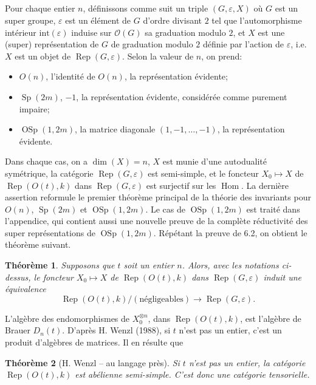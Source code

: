 \documentclass[11pt,a4paper]{article}
\theoremstyle{plain}
\newtheorem{theorem}{Th\'eor\`eme}[section]
\theoremstyle{definition}
\DeclareMathOperator{\Hom}{Hom}
\DeclareMathOperator{\Rep}{Rep}
\DeclareMathOperator{\Sp}{Sp}
\DeclareMathOperator{\OSp}{OSp}
\newcommand{\eps}{\varepsilon}
\begin{document}
\subsection{}
Pour chaque entier $n$, d\'efinissons comme suit un triple $(G, \eps, X)$ o\`u $G$ est un super groupe, $\eps$ est un \'el\'ement de $G$ d'ordre divisant $2$ tel que l'automorphisme int\'erieur $\text{int}(\eps)$ induise sur $\mathcal{O}(G)$ sa graduation modulo $2$, et $X$ est une (super) repr\'esentation de $G$ de graduation modulo $2$ d\'efinie par l'action de $\eps$, i.e. $X$ est un objet de $\Rep(G, \eps)$. Selon la valeur de $n$, on prend:
\begin{itemize}[label={},leftmargin=*]
\item[$n \geq 0$:] $O(n)$, l'identit\'e de $O(n)$, la repr\'esentation \'evidente;
\item[$n = -2m \leq 0$:] $\Sp(2m)$, $-1$, la repr\'esentation \'evidente, consid\'er\'ee comme purement impaire;
\item[$n = 1 - 2m \leq 0$:] $\OSp(1, 2m)$, la matrice diagonale $(1, -1, \ldots, -1)$, la repr\'esentation \'evidente.
\end{itemize}

Dans chaque cas, on a $\dim(X) = n$, $X$ est munie d'une autodualit\'e sym\'etrique, la cat\'egorie $\Rep(G, \eps)$ est semi-simple, et le foncteur $X_0 \mapsto X$ de $\Rep(O(t), k)$ dans $\Rep(G, \eps)$ est surjectif sur les $\Hom$. La derni\`ere assertion reformule le premier th\'eor\`eme principal de la th\'eorie des invariants pour $O(n)$, $\Sp(2m)$ et $\OSp(1, 2m)$. Le cas de $\OSp(1, 2m)$ est trait\'e dans l'appendice, qui contient aussi une nouvelle preuve de la compl\`ete r\'eductivit\'e des super repr\'esentations de $\OSp(1, 2m)$. R\'ep\'etant la preuve de 6.2, on obtient le th\'eor\`eme suivant.

\begin{theorem}
Supposons que $t$ soit un entier $n$. Alors, avec les notations ci-dessus, le foncteur $X_0 \mapsto X$ de $\Rep(O(t), k)$ dans $\Rep(G, \eps)$ induit une \'equivalence
\[
\Rep(O(t), k)/(\text{n\'egligeables}) \to \Rep(G, \eps).
\]
\end{theorem}

L'alg\`ebre des endomorphismes de $X_0^{\otimes n}$, dans $\Rep(O(t), k)$, est l'alg\`ebre de Brauer $D_n(t)$. D'apr\`es H. Wenzl (1988), si $t$ n'est pas un entier, c'est un produit d'alg\`ebres de matrices. Il en r\'esulte que

\begin{theorem}[H. Wenzl -- au langage pr\`es]
Si $t$ n'est pas un entier, la cat\'egorie $\Rep(O(t), k)$ est ab\'elienne semi-simple. C'est donc une cat\'egorie tensorielle.
\end{theorem}
\end{document}
